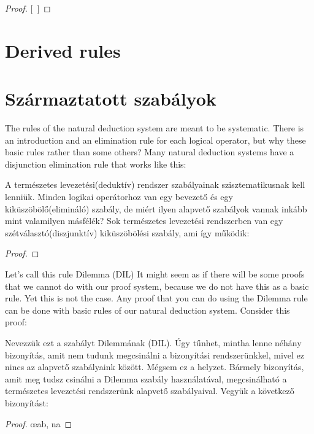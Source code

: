 \begin{proof}
\open
\close
{}[\ ]{}
\end{proof}

\section*{Derived rules}
\section{Származtatott szabályok}
The rules of the natural deduction system are meant to be systematic. There is an introduction and an elimination rule for each logical operator, but why these basic rules rather than some others? Many natural deduction systems have a disjunction elimination rule that works like this:

A természetes levezetési(deduktív) rendszer szabályainak szisztematikusnak kell lenniük. Minden logikai operátorhoz van egy bevezető és egy kiküszöbölő(elimináló) szabály, de miért ilyen alapvető szabályok vannak inkább mint valamilyen másfélék? Sok természetes levezetési rendszerben van egy szétválasztó(diszjunktív) kiküszöbölési szabály, ami így működik:

\begin{proof}
	 
\end{proof}

Let's call this rule Dilemma (DIL) It might seem as if there will be some proofs that we cannot do with our proof system, because we do not have this as a basic rule. Yet this is not the case. Any proof that you can do using the Dilemma rule can be done with basic rules of our natural deduction system. Consider this proof:

Nevezzük ezt a szabályt Dilemmának (DIL). Úgy tűnhet, mintha lenne néhány bizonyítás, amit nem tudunk megcsinálni a bizonyítási rendszerünkkel, mivel ez nincs az alapvető szabályaink között. Mégsem ez a helyzet. Bármely bizonyítás, amit meg tudsz csinálni a Dilemma szabály használatával, megcsinálható a természetes levezetési rendszerünk alapvető szabályaival. Vegyük a következő bizonyítást:

\begin{proof}
	\open
		\open
		\close
		\open
		\close
		\oe{ab, na}
	\close
	 
\end{proof}

